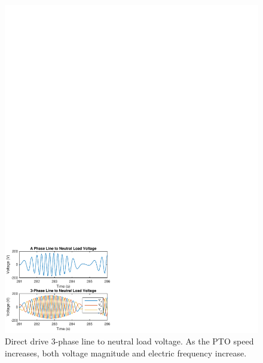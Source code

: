 \documentclass[twocolumn,10pt]{asme2e}
\begin{document}
\begin{figure}[t]
    \centering
    \includegraphics[width=1\columnwidth]{Images/DDVabc}
    \caption{Direct drive 3-phase line to neutral load voltage. As the PTO speed increases, both voltage magnitude and electric frequency increase.}
    \label{voltage}
    \end{figure}
\end{document}
